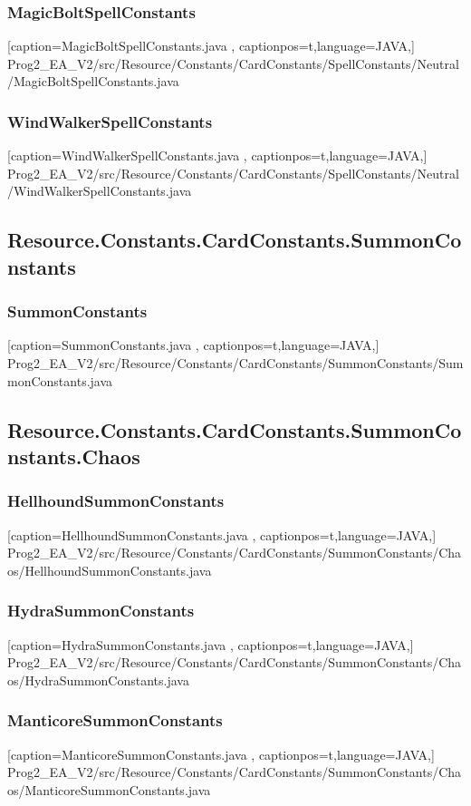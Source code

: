 \documentclass[a4paper,12pt]{scrartcl}
\begin{document}
	\subsubsection{MagicBoltSpellConstants}
	
	[caption={MagicBoltSpellConstants.java}
	\label{lst:javaclass},
	captionpos=t,language=JAVA,]
	{Prog2_EA_V2/src/Resource/Constants/CardConstants/SpellConstants/Neutral/MagicBoltSpellConstants.java}
	\subsubsection{WindWalkerSpellConstants}
	
	[caption={WindWalkerSpellConstants.java}
	\label{lst:javaclass},
	captionpos=t,language=JAVA,]
	{Prog2_EA_V2/src/Resource/Constants/CardConstants/SpellConstants/Neutral/WindWalkerSpellConstants.java}
	\subsection{Resource.Constants.CardConstants.SummonConstants}
	\subsubsection{SummonConstants}
	
	[caption={SummonConstants.java}
	\label{lst:javaclass},
	captionpos=t,language=JAVA,]
	{Prog2_EA_V2/src/Resource/Constants/CardConstants/SummonConstants/SummonConstants.java}
	\subsection{Resource.Constants.CardConstants.SummonConstants.Chaos}
	\subsubsection{HellhoundSummonConstants}
	
	[caption={HellhoundSummonConstants.java}
	\label{lst:javaclass},
	captionpos=t,language=JAVA,]
	{Prog2_EA_V2/src/Resource/Constants/CardConstants/SummonConstants/Chaos/HellhoundSummonConstants.java}
	\subsubsection{HydraSummonConstants}
	
	[caption={HydraSummonConstants.java}
	\label{lst:javaclass},
	captionpos=t,language=JAVA,]
	{Prog2_EA_V2/src/Resource/Constants/CardConstants/SummonConstants/Chaos/HydraSummonConstants.java}
	\subsubsection{ManticoreSummonConstants}
	
	[caption={ManticoreSummonConstants.java}
	\label{lst:javaclass},
	captionpos=t,language=JAVA,]
	{Prog2_EA_V2/src/Resource/Constants/CardConstants/SummonConstants/Chaos/ManticoreSummonConstants.java}
\end{document}
